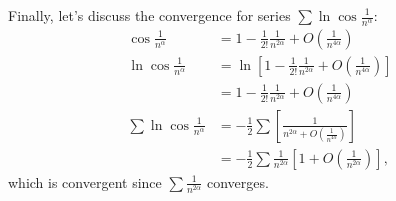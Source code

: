 Finally, let's discuss the convergence for series $\sum \ln\cos\frac{1}{n^\alpha}$:
\begin{align*}
\cos\frac{1}{n^\alpha}&=1-\frac{1}{2!}\frac{1}{n^{2\alpha}}+O(\frac{1}{n^{4\alpha}})\\
\ln\cos\frac{1}{n^\alpha}&=\ln\left[1-\frac{1}{2!}\frac{1}{n^{2\alpha}}+O(\frac{1}{n^{4\alpha}})\right]\\
&=1-\frac{1}{2!}\frac{1}{n^{2\alpha}}+O(\frac{1}{n^{4\alpha}})\\
\sum \ln\cos\frac{1}{n^\alpha}&=-\frac{1}{2}\sum\left[\frac{1}{n^{2\alpha}+O(\frac{1}{n^{4\alpha}})}\right]\\
&=-\frac{1}{2}\sum\frac{1}{n^{2\alpha}}\left[1+O(\frac{1}{n^{2\alpha}})\right],
\end{align*}
which is convergent since $\sum\frac{1}{n^{2\alpha}}$ converges.












 